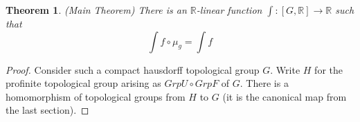 \documentclass[13pt]{amsart}
\newtheorem{theorem}{Theorem}
\theoremstyle{definition}
\begin{document}
\begin{theorem}(Main Theorem)
There is an $\mathbb{R}$-linear function $\int : [G,\mathbb{R}] \rightarrow \mathbb{R}$ such that 
\[ \int f \circ \mu_g = \int f  \]
\end{theorem}

\begin{proof}
Consider such a compact hausdorff topological group $G$. Write $H$ for the profinite topological group arising as $Grp U \circ Grp F$ of $G$. There is a homomorphism of topological groups from $H$ to $G$ (it is the canonical map from the last section).
\end{proof}
\end{document}
